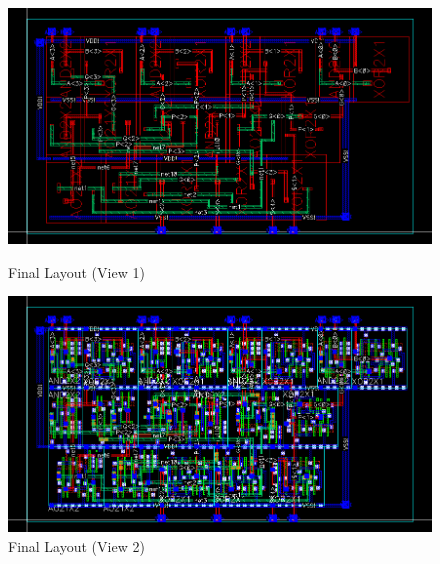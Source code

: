 \documentclass[a4paper,12pt]{article}
\begin{document}
\begin{figure}[H]
    \centering
    \begin{minipage}{0.49\textwidth}
        \centering
        \includegraphics[width=\textwidth]{images/LO.png}
        \caption{Final Layout (View 1)}
    \end{minipage}
    \hfill
    \begin{minipage}{0.49\textwidth}
        \centering
        \includegraphics[width=\textwidth]{images/LO1.png}
        \caption{Final Layout (View 2)}
    \end{minipage}
\end{figure}
\end{document}

